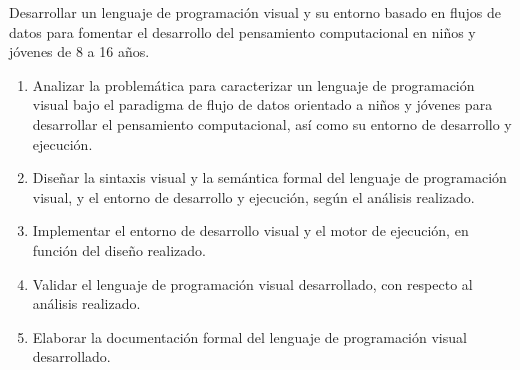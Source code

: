 

Desarrollar un lenguaje de programación visual y su entorno basado en flujos de datos para fomentar el desarrollo del pensamiento computacional en niños y jóvenes de 8 a 16 años.


\newcommand{\oeOne}{Analizar la problemática para caracterizar un lenguaje de programación visual bajo el paradigma de flujo de datos orientado a niños y jóvenes para desarrollar el pensamiento computacional, así como su entorno de desarrollo y ejecución.}
\newcommand{\oeTwo}{Diseñar la sintaxis visual y la semántica formal del lenguaje de programación visual, y el entorno de desarrollo y ejecución, según el análisis realizado.}
\newcommand{\oeThree}{Implementar el entorno de desarrollo visual y el motor de ejecución, en función del diseño realizado.}
\newcommand{\oeFour}{Validar el lenguaje de programación visual desarrollado, con respecto al análisis realizado.}
\newcommand{\oeFive}{Elaborar la documentación formal del lenguaje de programación visual desarrollado.}
\begin{enumerate}
  \item \oeOne
  \item \oeTwo
  \item \oeThree
  \item \oeFour
  \item \oeFive
\end{enumerate}
